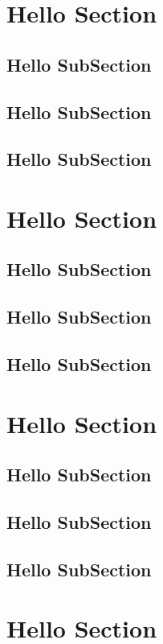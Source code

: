\clearpage

\section{Hello Section}
\lipsum[3-5]
\subsection{Hello SubSection}
\lipsum[3-5]
\subsection{Hello SubSection}
\lipsum[3-5]
\subsection{Hello SubSection}
\lipsum[3-5]

\section{Hello Section}
\lipsum[3-5]
\subsection{Hello SubSection}
\lipsum[3-5]
\subsection{Hello SubSection}
\lipsum[3-5]
\subsection{Hello SubSection}
\lipsum[3-5]

\section{Hello Section}
\lipsum[3-5]
\subsection{Hello SubSection}
\lipsum[3-5]
\subsection{Hello SubSection}
\lipsum[3-5]
\subsection{Hello SubSection}
\lipsum[3-5]

\section{Hello Section}
\lipsum[3-5]
